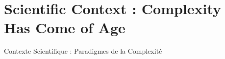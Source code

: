 


\section*{Scientific Context : Complexity Has Come of Age}{Contexte Scientifique : Paradigmes de la Complexité}




